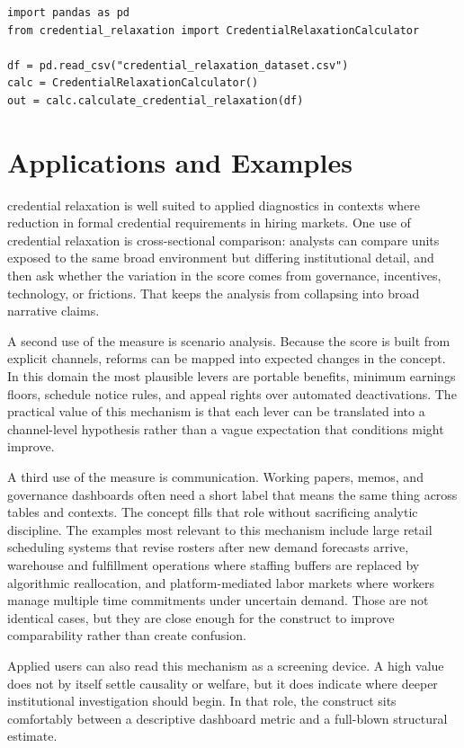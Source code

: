 \documentclass[12pt]{article}
\begin{document}
\begin{verbatim}
import pandas as pd
from credential_relaxation import CredentialRelaxationCalculator

df = pd.read_csv("credential_relaxation_dataset.csv")
calc = CredentialRelaxationCalculator()
out = calc.calculate_credential_relaxation(df)
\end{verbatim}

\section{Applications and Examples}
credential relaxation is well suited to applied diagnostics in contexts where reduction in formal credential requirements in hiring markets. One use of credential relaxation is cross-sectional comparison: analysts can compare units exposed to the same broad environment but differing institutional detail, and then ask whether the variation in the score comes from governance, incentives, technology, or frictions. That keeps the analysis from collapsing into broad narrative claims.

A second use of the measure is scenario analysis. Because the score is built from explicit channels, reforms can be mapped into expected changes in the concept. In this domain the most plausible levers are portable benefits, minimum earnings floors, schedule notice rules, and appeal rights over automated deactivations. The practical value of this mechanism is that each lever can be translated into a channel-level hypothesis rather than a vague expectation that conditions might improve.

A third use of the measure is communication. Working papers, memos, and governance dashboards often need a short label that means the same thing across tables and contexts. The concept fills that role without sacrificing analytic discipline. The examples most relevant to this mechanism include large retail scheduling systems that revise rosters after new demand forecasts arrive, warehouse and fulfillment operations where staffing buffers are replaced by algorithmic reallocation, and platform-mediated labor markets where workers manage multiple time commitments under uncertain demand. Those are not identical cases, but they are close enough for the construct to improve comparability rather than create confusion.

Applied users can also read this mechanism as a screening device. A high value does not by itself settle causality or welfare, but it does indicate where deeper institutional investigation should begin. In that role, the construct sits comfortably between a descriptive dashboard metric and a full-blown structural estimate.
\end{document}
